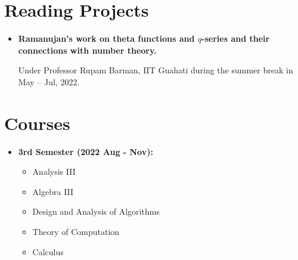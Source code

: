 \documentclass[10pt,a4paper,sans]{moderncv}        %
\begin{document}
	\section{Reading Projects}
		\begin{itemize}
			\item \textbf{Ramanujan's work on theta functions and $q$-series and their connections with number theory.} 
			
			\hfill Under Professor Rupam Barman, IIT Guahati during the summer break in May -- Jul, 2022.
		\end{itemize}

	\section{Courses}
	

	
	\begin{itemize}

		\item \textbf{3rd Semester (2022 Aug - Nov):} \begin{itemize}
			\item Analysis III
			\item Algebra III
			\item Design and Analysis of Algorithms
			\item Theory of Computation
			\item Calculus
		\end{itemize}
		
	\end{itemize}
	
\end{document}
